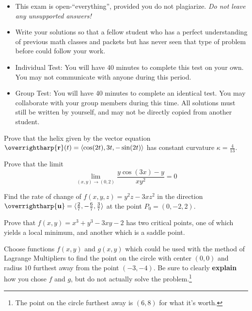 \documentclass[12pt]{exam}
\newcommand{\harpvec}[1]{\overrightharp{\ensuremath{\mathbf{#1}}}}
\newcommand{\vect}[1]{\harpvec{#1}}
\newcommand{\<}{\langle}
\renewcommand{\>}{\rangle}
\begin{document}
\begin{center}
\end{center}
\vspace{0.1in}

\vspace{12pt}

\begin{itemize}
  \item This exam is open-``everything'', provided you do not plagiarize.
        \textit{Do not leave any unsupported answers!}
  \item Write your solutions so that a fellow student who has a perfect
        understanding of previous math classes and packets but
        has never seen that type of problem before could follow your work.
  \item Individual Test: You will have 40 minutes to complete this test
        on your own. You may not communicate with anyone during this period.
  \item Group Test: You will have 40 minutes to complete an identical test.
        You may collaborate with your group members during this time. All
        solutions must still be written by yourself, and may not be directly
        copied from another student.
\end{itemize}

\newpage

\begin{questions}

\setcounter{question}{0}

\question[6]
  Prove that the helix given by the vector equation
  $\vect{r}(t) = \<\cos(2t),3t,-\sin(2t)\>$
  has constant curvature $\kappa=\frac{4}{13}$.

\newpage

\question[6]
  Prove that the limit
  \[
    \lim_{(x,y)\to(0,2)}
    \frac{y\cos(3x)-y}{xy^2}
      =
    0
  \]

\newpage

\question[6]
  Find the rate of change of $f(x,y,z)=y^2z-3xz^2$ in the direction
  $\vect{u}=\<\frac{2}{7},-\frac{6}{7},\frac{3}{7}\>$
  at the point $P_0=(0,-2,2)$.

\newpage

\question[6]
  Prove that $f(x,y)=x^3+y^3-3xy-2$ has two critical points, one of
  which yields a local minimum, and another which is a saddle point.

\newpage

\question[6]
  Choose functions $f(x,y)$ and $g(x,y)$ which could be used with the method
  of Lagrange Multipliers to find the point
  on the circle with center $(0,0)$ and radius $10$
  furthest away from the point $(-3,-4)$.
  Be sure to clearly \textbf{explain} how you chose $f$ and $g$,
  but do not actually solve the problem.\footnote{The point on the circle
  furthest away is $(6,8)$ for what it's worth.}


\end{questions}
\end{document}
